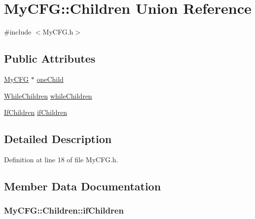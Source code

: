 \hypertarget{union_my_c_f_g_1_1_children}{\section{My\-C\-F\-G\-:\-:Children Union Reference}
\label{union_my_c_f_g_1_1_children}
}


{\ttfamily \#include $<$My\-C\-F\-G.\-h$>$}

\subsection*{Public Attributes}
\begin{DoxyCompactItemize}
\item 
\hyperlink{class_my_c_f_g}{My\-C\-F\-G} $\ast$ \hyperlink{union_my_c_f_g_1_1_children_a2c3d531a988c448a8d71ae776069fd81}{one\-Child}
\item 
\hyperlink{struct_my_c_f_g_1_1_while_children}{While\-Children} \hyperlink{union_my_c_f_g_1_1_children_a45c94090b7b225a2edaf75b2fab4a654}{while\-Children}
\item 
\hyperlink{struct_my_c_f_g_1_1_if_children}{If\-Children} \hyperlink{union_my_c_f_g_1_1_children_a563640df99d83f3b2fc8125d23639cf0}{if\-Children}
\end{DoxyCompactItemize}


\subsection{Detailed Description}


Definition at line 18 of file My\-C\-F\-G.\-h.



\subsection{Member Data Documentation}
\hypertarget{union_my_c_f_g_1_1_children_a563640df99d83f3b2fc8125d23639cf0}{
\subsubsection[{if\-Children}]{ My\-C\-F\-G\-::\-Children\-::if\-Children}}\label{union_my_c_f_g_1_1_children_a563640df99d83f3b2fc8125d23639cf0}


